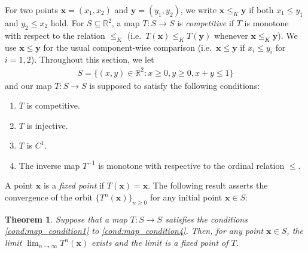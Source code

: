 \documentclass[letterpaper,11pt]{article}
\newtheorem{theorem}{Theorem}[section]
\begin{document}
For two points $\mathbf{x}=(x_1,x_2)$ and $\mathbf{y}=(y_1,y_2)$, we write $\mathbf{x}\leq_K \mathbf{y}$ if both $x_1\leq y_1$ and $y_2 \leq x_2$ hold.
For $S\subseteq \mathbb{R}^2$, a map $T:S \to S$ is \emph{competitive} if $T$ is monotone with respect to the relation $\leq_K$ (i.e.~$T(\mathbf{x})\leq_K T(\mathbf{y})$ whenever $\mathbf{x}\leq_K \mathbf{y}$).
We use $\mathbf{x}\leq \mathbf{y}$ for the usual component-wise comparison (i.e.~$\mathbf{x}\leq\mathbf{y}$ if $x_i\leq y_i$ for $i=1,2$).
Throughout this section, we let
\begin{align*}
S=\{(x,y)\in\mathbb{R}^2:x\geq 0,y\geq 0,x+y\leq 1\}
\end{align*}
and our map $T:S\to S$ is supposed to satisfy the following conditions: 
\begin{enumerate}[label=(C\arabic*)]
\item $T$ is competitive. \label{cond:map_condition1}
\item $T$ is injective. \label{cond:map_condition2}
\item $T$ is $C^1$. \label{cond:map_condition3} %
\item The inverse map $T^{-1}$ is monotone with respective to the ordinal relation $\leq$. \label{cond:map_condition4}
\end{enumerate}

A point $\mathbf{x}$ is a \emph{fixed point} if $T(\mathbf{x})=\mathbf{x}$.
The following result asserts the convergence of the orbit $\{T^n(\mathbf{x})\}_{n\geq 0}$ for any initial point $\mathbf{x}\in S$:
\begin{theorem} \label{thm:orbit_convergence}
Suppose that a map $T:S\to S$ satisfies the conditions \ref{cond:map_condition1} to \ref{cond:map_condition4}.
Then, for any point $\mathbf{x}\in S$, the limit $\lim_{n\to\infty}T^n(\mathbf{x})$ exists and the limit is a fixed point of $T$.
\end{theorem}
\end{document}
